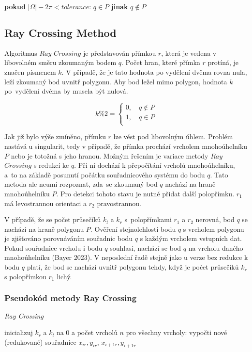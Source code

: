 \documentclass[15pt]{article}
\begin{document}
\begin{spacing}{1.5}
\begin{algorithm}
\begin{algorithmic}[1]
        \State \textbf{pokud} $|\varOmega| - 2\pi < tolerance$:
        \State \indent $q \in P$
        \State \textbf{jinak} $q \notin P$
    \end{algorithmic}
\end{algorithm}

\subsection*{Ray Crossing Method}
Algoritmus $Ray$ $Crossing$ je představován přímkou $r$, která je vedena v libovolném směru zkoumaným bodem $q$. Počet hran, které přímka $r$ protíná, je značen písmenem $k$. V případě, že je tato hodnota po vydělení dvěma rovna nula, leží zkoumaný bod uvnitř polygonu. Aby bod ležel mimo polygon, hodnota $k$ po vydělení dvěma by musela být nulová. 

\begin{equation*}
k\%2=\begin{cases}
    0, \quad q  \notin P\\
    1, \quad q  \in P\\
\end{cases}
\end{equation*}

Jak již bylo výše zmíněno, přímku $r$ lze vést pod libovolným úhlem. Problém nastává u singularit, tedy v případě, že přímka prochází vrcholem mnohoúhelníku $P$ nebo je totožná s jeho hranou. Možným řešením je variace metody $Ray$ $Crossing$ s redukcí ke $q$. Při ní dochází k přepočítání vrcholů mnohoúhelníku, a to na základě posunutí počátku souřadnicového systému do bodu $q$. Tato metoda ale neumí rozpoznat, zda se zkoumaný bod $q$ nachází na hraně mnohoúhelníku $P$. Pro detekci tohoto stavu je nutné přidat další polopřímku. $r_1$ má levostrannou orientaci a $r_2$ pravostrannou. 

V případě, že se počet průsečíků $k_l$ a $k_r$ s polopřímkami $r_1$ a $r_2$ nerovná, bod $q$ se nachází na hraně polygonu $P$. Ověření stejnolehlosti bodu $q$ s vrcholem polygonu je zjišťováno porovnáváním souřadnic bodu $q$ s každým vrcholem vstupních dat. Pokud souřadnice vrcholu i bodu $q$ souhlasí, nachází se bod $q$ na vrcholu daného mnohoúhelníku (Bayer 2023). V neposlední řadě stejně jako u verze bez redukce k bodu $q$ platí, že bod se nachází uvnitř polygonu tehdy, když je počet průsečíků $k_r$ s polopřímkou $r_1$ lichý. 


\subsubsection*{Pseudokód metody Ray Crossing}
\begin{algorithm}
    \caption {\textit{Ray Crossing}}
    \begin{algorithmic}[1]
        \State inicializuj $k_r$ a $k_l$ na 0 a počet vrcholů $n$
        \State pro všechny vrcholy:
        \State \indent vypočti nové (redukované) souřadnice $x_{ir}, y_{ir}$, $x_{i+1r}, y_{i+1r}$\\
        

\end{algorithmic}
\end{algorithm}
\end{spacing}
\end{document}
